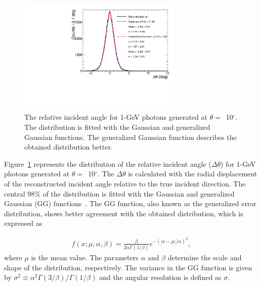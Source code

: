 \documentclass[12pt,times,draftclsnofoot,a4paper]{elsarticle}
\begin{document}
\begin{figure}[!hbt]
\centering
\includegraphics[width=0.7\textwidth]{Fig3_fit_GG.pdf}
\caption{ The relative incident angle for 1-GeV photons generated at $\theta=$~10$^{\circ}$. The distribution is fitted with the Gaussian and generalized Gaussian functions. The generalized Gaussian function describes the obtained distribution better.}
\label{fig:angle_10degree}
\end{figure}

Figure~\ref{fig:angle_10degree} represents the distribution of the relative incident angle ($\Delta\theta$) for 1-GeV photons generated at $\theta=$~10$^{\circ}$. The $\Delta\theta$ is calculated with the radial displacement of the reconstructed incident angle relative to the true incident direction. The central 98\% of the distribution is fitted with the Gaussian and generalized Gaussian (GG) functions~\cite{GGfun}. The GG function, also known as the generalized error distribution, shows better agreement with the obtained distribution, which is expressed as

\begin{eqnarray} 
f(x; \mu, \alpha, \beta) = \frac{\beta}{2 \alpha \Gamma(1/\beta)}e^{-(|x-\mu|/\alpha)^\beta},
\label{eqn:gg}
\end{eqnarray}
where $\mu$ is the mean value. The parameters $\alpha$ and $\beta$ determine the scale and shape of the distribution, respectively. The variance in the GG function is given by $\sigma^2 \equiv \alpha^2 \Gamma(3/\beta) / \Gamma(1/\beta)$ and the angular resolution is defined as $\sigma$. %
\end{document}
